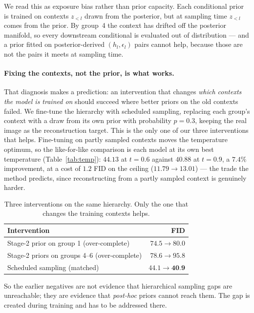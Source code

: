 \documentclass[sigconf,nonacm]{acmart}
\newcommand{\best}[1]{\textbf{#1}}
\begin{document}
We read this as exposure bias rather than prior capacity. Each conditional prior
is trained on contexts $z_{<l}$ drawn from the posterior, but at sampling time
$z_{<l}$ comes from the prior. By group~4 the context has drifted off the
posterior manifold, so every downstream conditional is evaluated out of
distribution --- and a prior fitted on posterior-derived $(h_l, \epsilon_l)$
pairs cannot help, because those are not the pairs it meets at sampling time.

\paragraph{Fixing the contexts, not the prior, is what works.}
That diagnosis makes a prediction: an intervention that changes \emph{which
contexts the model is trained on} should succeed where better priors on the old
contexts failed. We fine-tune the hierarchy with scheduled sampling, replacing
each group's context with a draw from its own prior with probability
$p{=}0.3$, keeping the real image as the reconstruction target. This is the only
one of our three interventions that helps. Fine-tuning on partly sampled
contexts moves the temperature optimum, so the like-for-like comparison is each
model at its own best temperature (Table~\ref{tab:temp}): $44.13$ at
$t{=}0.6$ against $40.88$ at $t{=}0.9$, a $7.4\%$ improvement, at a cost of
$1.2$ FID on the ceiling ($11.79 \to 13.01$) --- the trade the method predicts,
since reconstructing from a partly sampled context is genuinely harder.

\begin{table}[h]
\caption{Three interventions on the same hierarchy. Only the one that changes
the training contexts helps.}
\small
\begin{tabular}{lr}
\toprule
Intervention & FID \\
\midrule
Stage-2 prior on group 1 (over-complete)     & $74.5 \to 80.0$ \\
Stage-2 priors on groups 4--6 (over-complete)& $78.6 \to 95.8$ \\
Scheduled sampling (matched)                 & $44.1 \to \best{40.9}$ \\
\bottomrule
\end{tabular}
\end{table}

So the earlier negatives are not evidence that hierarchical sampling gaps are
unreachable; they are evidence that \emph{post-hoc} priors cannot reach them.
The gap is created during training and has to be addressed there.
\end{document}
